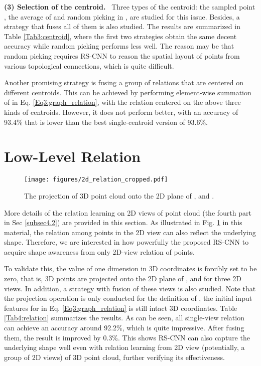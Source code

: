 \documentclass[10pt,twocolumn,letterpaper]{article}
\begin{document}
\vspace{10pt}
\noindent \textbf{(3) Selection of the centroid.} \ Three types of the centroid: the sampled point , the average of  and random picking in , are studied for this issue. Besides, a strategy that fuses all of them is also studied. The results are summarized in Table \ref{Tab3:centroid}, where the first two strategies obtain the same decent accuracy while random picking performs less well. The reason may be that random picking requires RS-CNN to reason the spatial layout of points from various topological connections, which is quite difficult.

Another promising strategy is fusing a group of relations that are centered on different centroids. This can be achieved by performing element-wise summation of  in Eq. \eqref{Eq3:graph_relation}, with the relation centered on the above three kinds of centroids. However, it does not perform better, with an accuracy of 93.4\% that is lower than the best single-centroid version of 93.6\%.

 
\section{Low-Level Relation }
\label{sec:Relation}
\begin{figure}[t]
\centerline{\texttt{[image: figures/2d\_relation\_cropped.pdf]}}
\caption{The projection of 3D point cloud onto the 2D plane of ,  and .}
\label{fig1:2d_relation}
\end{figure}

More details of the relation learning on 2D views of point cloud (the fourth part in Sec \ref{subsec4.2}) are provided in this section. As illustrated in Fig. \ref{fig1:2d_relation} in this material, the relation among points in the 2D view can also reflect the underlying shape. Therefore, we are interested in how powerfully the proposed RS-CNN to acquire shape awareness from only 2D-view relation of points.

To validate this, the value of one dimension in 3D coordinates is forcibly set to be zero, that is, 3D points are projected onto the 2D plane of ,  and  for three 2D views. In addition, a strategy with fusion of these views is also studied. Note that the projection operation is only conducted for the definition of , the initial input features for  in Eq. \eqref{Eq3:graph_relation} is still intact 3D coordinates. Table \ref{Tab4:relation} summarizes the results. As can be seen, all single-view relation can achieve an accuracy around 92.2\%, which is quite impressive. After fusing them, the result is improved by 0.3\%. This shows RS-CNN can also capture the underlying shape well even with relation learning from 2D view (potentially, a group of 2D views) of 3D point cloud, further verifying its effectiveness.

 
\end{document}
